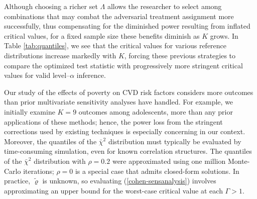 \documentclass[12pt,leqno,titlepage]{amsart}
\newcommand{\1}{\mathbbm{1}}
\begin{document}
\begin{bibunit}
Although choosing a richer set $\Lambda$ allows the researcher to select among combinations that may combat the adversarial treatment assignment more successfully, thus compensating for the diminished power resulting from inflated critical values, for a fixed sample size these benefits diminish as $K$ grows. In Table \ref{tab:quantiles}, we see that the critical values for various reference distributions increase markedly with $K$, forcing these previous strategies to compare the optimized test statistic with progressively more stringent critical values for valid level--$\alpha$ inference. 
\begin{table}[!t]
\centering
\caption{Critical values for relevant distributions at values of $K$. We show ($1-\alpha$)--quantiles of the standard Normal distribution and the square root of the ($1-\alpha$)--quantiles for remaining distributions at $\alpha = 0.05$. Quantiles of the $\bar{\chi}^2$ distribution are taken over the nonnegative orthant. $\rho$ denotes the constant correlation among all $K$ outcomes.} 
\label{tab:quantiles}
\end{table}
Our study of the effects of poverty on CVD risk factors considers more outcomes than prior multivariate sensitivity analyses have handled. For example, we initially examine $K = 9$ outcomes among adolescents, more than any prior applications of these methods; hence, the power loss from the stringent corrections used by existing techniques is especially concerning in our context. Moreover, the quantiles of the $\bar{\chi}^2$ distribution must typically be evaluated by time-consuming simulation, even for known correlation structures. The quantiles of the $\bar{\chi}^2$ distribution with $\rho = 0.2$ were approximated using one million Monte-Carlo iterations; $\rho=0$ is a special case that admits closed-form solutions. In practice, $\boldsymbol{\tilde{\varrho}}$ is unknown, so evaluating (\ref{cohen-sensanalysis}) involves approximating an upper bound for the worst-case critical value at each $\Gamma > 1$. %




\end{bibunit}
\end{document}
